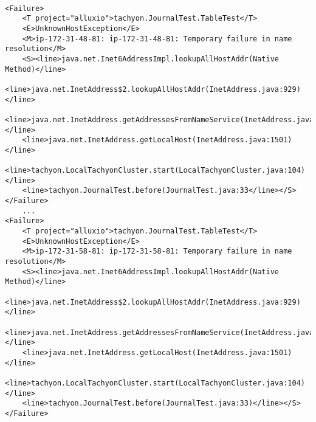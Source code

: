 

\vspace{5px}
\begin{lstlisting}[style=XMLStyle, caption=Two flaky failures reported in Alluxio project after parsing their failure logs,label=lst:flakyFailures]

<Failure>
    <T project="alluxio">tachyon.JournalTest.TableTest</T>
    <E>UnknownHostException</E>
    <M>ip-172-31-48-81: ip-172-31-48-81: Temporary failure in name resolution</M>
    <S><line>java.net.Inet6AddressImpl.lookupAllHostAddr(Native Method)</line>
    <line>java.net.InetAddress$2.lookupAllHostAddr(InetAddress.java:929)</line>
    <line>java.net.InetAddress.getAddressesFromNameService(InetAddress.java:1324)</line>
    <line>java.net.InetAddress.getLocalHost(InetAddress.java:1501)</line>
    <line>tachyon.LocalTachyonCluster.start(LocalTachyonCluster.java:104)</line>
    <line>tachyon.JournalTest.before(JournalTest.java:33</line></S>
</Failure>
    ...
<Failure>
    <T project="alluxio">tachyon.JournalTest.TableTest</T>
    <E>UnknownHostException</E>
    <M>ip-172-31-58-81: ip-172-31-58-81: Temporary failure in name resolution</M>
    <S><line>java.net.Inet6AddressImpl.lookupAllHostAddr(Native Method)</line>             
    <line>java.net.InetAddress$2.lookupAllHostAddr(InetAddress.java:929)</line>            
    <line>java.net.InetAddress.getAddressesFromNameService(InetAddress.java:1324)</line>            
    <line>java.net.InetAddress.getLocalHost(InetAddress.java:1501)</line>
    <line>tachyon.LocalTachyonCluster.start(LocalTachyonCluster.java:104)</line>
    <line>tachyon.JournalTest.before(JournalTest.java:33)</line></S>
</Failure>
\end{lstlisting}

\vspace{5px}

